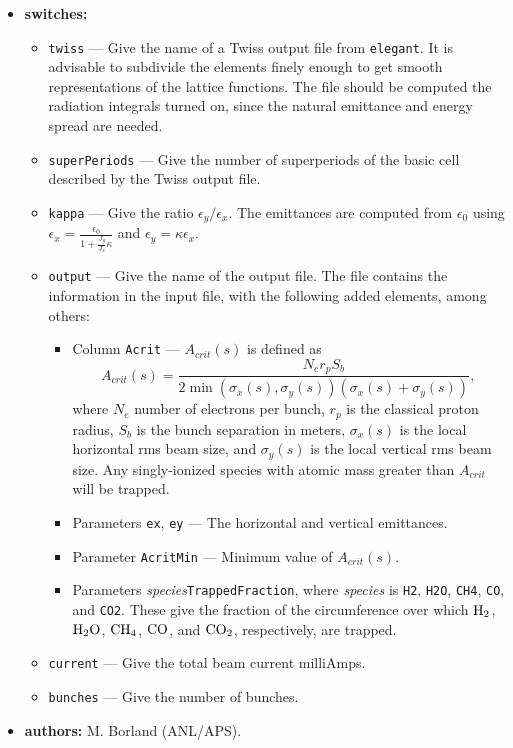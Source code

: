\documentclass[11pt]{article}
\begin{document}
\begin{itemize}
\item {\bf switches:}
\begin{itemize}
\item {\tt twiss} --- Give the name of a Twiss output file from {\tt elegant}. It is advisable to subdivide the
elements finely enough to get smooth representations of the lattice functions. The file should be computed the
radiation integrals turned on, since the natural emittance and energy spread are needed.
\item {\tt superPeriods} --- Give the number of superperiods of the basic cell described by the Twiss output file.
\item {\tt kappa} --- Give the ratio $\epsilon_y/\epsilon_x$. The emittances are computed from $\epsilon_0$ using
$\epsilon_x = \frac{\epsilon_0}{1 + \frac{J_y}{J_x}\kappa}$ and $\epsilon_y = \kappa \epsilon_x$. 
\item {\tt output} --- Give the name of the output file. The file contains the information in the input file, with
the following added elements, among others:
\begin{itemize}
\item Column {\tt Acrit} --- $A_{crit}(s)$ is defined as\cite{Bacconier-SPS80-2}
\begin{equation}
A_{crit}(s) = \frac{N_e r_p S_b}{2 \min (\sigma_x(s), \sigma_y(s)) (\sigma_x(s) + \sigma_y(s))},
\end{equation}
where $N_e$ number of electrons per bunch, $r_p$ is the classical proton radius, $S_b$ is the bunch separation in meters, 
$\sigma_x(s)$ is the local horizontal rms beam size, and $\sigma_y(s)$ is the local vertical rms beam size.
Any singly-ionized species with atomic mass greater than $A_{crit}$ will be trapped.
\item Parameters {\tt ex}, {\tt ey} --- The horizontal and vertical emittances.
\item Parameter {\tt AcritMin} --- Minimum value of $A_{crit}(s)$.
\item Parameters {\em species}\verb|TrappedFraction|, where {\em species} is \verb|H2|,
\verb|H2O|, \verb|CH4|, \verb|CO|, and \verb|CO2|. These give
the fraction of the circumference over which ${\rm H_2}$, ${\rm H_2 O}$, ${\rm CH_4}$, ${\rm CO}$, and ${\rm CO_2}$, respectively, are
trapped. 
\end{itemize}
\item {\tt current} --- Give the total beam current milliAmps.
\item {\tt bunches} --- Give the number of bunches.
\end{itemize}

\item {\bf authors:} M. Borland (ANL/APS).

\end{itemize}
\end{document}
